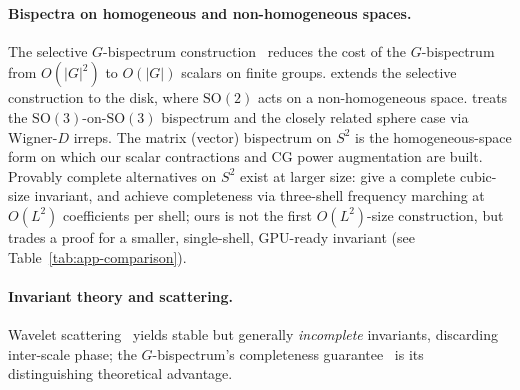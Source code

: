 \documentclass{article}
\theoremstyle{definition}
\theoremstyle{remark}
\newcommand{\SO}{\mathrm{SO}}
\theoremstyle{definition}
\begin{document}
\paragraph{Bispectra on homogeneous and non-homogeneous spaces.}
The selective $G$-bispectrum
construction~\citep{mataigne2024selective} reduces the cost of the
$G$-bispectrum from $O(|G|^2)$ to $O(|G|)$ scalars on finite groups.
\citet{myers2025selective} extends the selective construction to the
disk, where $\SO(2)$ acts on a non-homogeneous space.
\citet{kakarala2012bispectrum} treats the $\SO(3)$-on-$\SO(3)$
bispectrum and the closely related sphere case via Wigner-$D$ irreps.
The matrix (vector) bispectrum on $S^2$ is the homogeneous-space form
on which our scalar contractions and CG power augmentation are built.
Provably complete alternatives on $S^2$ exist at larger size:
\citet{edidin2024orbit} give a complete cubic-size invariant, and
\citet{bendory2025orbit} achieve completeness via three-shell frequency
marching at $O(L^2)$ coefficients per shell; ours is not the first
$O(L^2)$-size construction, but trades a proof for a smaller,
single-shell, GPU-ready invariant (see
Table~\ref{tab:app-comparison}).

\paragraph{Invariant theory and scattering.}
Wavelet scattering~\citep{mallat2012scattering,esteves2018spherical}
yields stable but generally \emph{incomplete} invariants, discarding
inter-scale phase; the $G$-bispectrum's completeness
guarantee~\citep{giannakis1989bispectrum, kakarala2012bispectrum} is
its distinguishing theoretical advantage.
\end{document}
